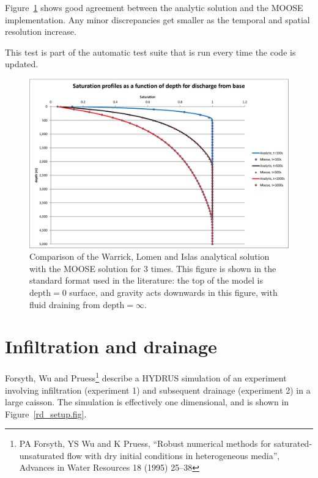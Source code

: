 \documentclass[]{scrreprt}
\begin{document}
Figure~\ref{wli.fig} shows good agreement between the analytic
solution and the MOOSE implementation.  Any minor discrepancies get
smaller as the temporal and spatial resolution increase.

This test is part of the automatic test suite that is run every time
the code is updated.


\begin{figure}[htb]
\centering
\includegraphics[width=16cm]{wli.eps}
\caption{Comparison of the Warrick, Lomen and Islas analytical solution
  with the MOOSE solution for 3 times.  This figure is shown in the
  standard format used in the literature: the top of the model is
  $\mbox{depth}=0$ surface, and gravity acts downwards in this figure,
with fluid draining from $\mbox{depth}=\infty$.}
\label{wli.fig}
\end{figure}




\chapter{Infiltration and drainage}
\label{forsyth}

Forsyth, Wu and Pruess\footnote{PA Forsyth, YS Wu and K Pruess,
  ``Robust numerical methods for saturated-unsaturated flow with dry
  initial conditions in heterogeneous media'', Advances in Water
  Resources 18 (1995) 25--38} describe a HYDRUS simulation of an
experiment involving infiltration (experiment 1) and subsequent
drainage (experiment 2) in a large caisson.  The simulation is
effectively one dimensional, and is shown in
Figure~\ref{rd_setup.fig}.
\end{document}

